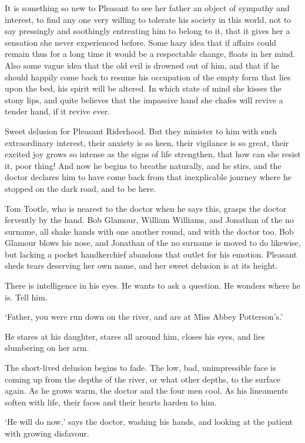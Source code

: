 It is something so new to Pleasant to see her father an object of
sympathy and interest, to find any one very willing to tolerate his
society in this world, not to say pressingly and soothingly entreating
him to belong to it, that it gives her a sensation she never experienced
before. Some hazy idea that if affairs could remain thus for a long time
it would be a respectable change, floats in her mind. Also some vague
idea that the old evil is drowned out of him, and that if he should
happily come back to resume his occupation of the empty form that lies
upon the bed, his spirit will be altered. In which state of mind she
kisses the stony lips, and quite believes that the impassive hand she
chafes will revive a tender hand, if it revive ever.

Sweet delusion for Pleasant Riderhood. But they minister to him with
such extraordinary interest, their anxiety is so keen, their vigilance
is so great, their excited joy grows so intense as the signs of life
strengthen, that how can she resist it, poor thing! And now he begins
to breathe naturally, and he stirs, and the doctor declares him to have
come back from that inexplicable journey where he stopped on the dark
road, and to be here.

Tom Tootle, who is nearest to the doctor when he says this, grasps
the doctor fervently by the hand. Bob Glamour, William Williams, and
Jonathan of the no surname, all shake hands with one another round, and
with the doctor too. Bob Glamour blows his nose, and Jonathan of the
no surname is moved to do likewise, but lacking a pocket handkerchief
abandons that outlet for his emotion. Pleasant sheds tears deserving her
own name, and her sweet delusion is at its height.

There is intelligence in his eyes. He wants to ask a question. He
wonders where he is. Tell him.

‘Father, you were run down on the river, and are at Miss Abbey
Potterson’s.’

He stares at his daughter, stares all around him, closes his eyes, and
lies slumbering on her arm.

The short-lived delusion begins to fade. The low, bad, unimpressible
face is coming up from the depths of the river, or what other depths, to
the surface again. As he grows warm, the doctor and the four men cool.
As his lineaments soften with life, their faces and their hearts harden
to him.

‘He will do now,’ says the doctor, washing his hands, and looking at the
patient with growing disfavour.

